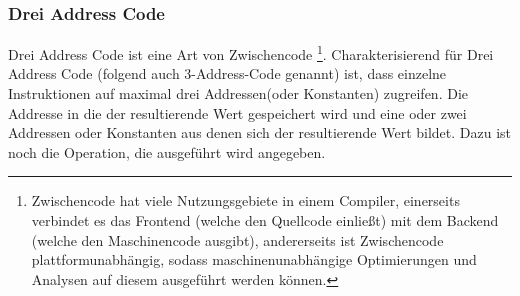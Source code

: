 \subsubsection{Drei Address Code} \label{t:tac}
Drei Address Code ist eine Art von Zwischencode
\footnote{Zwischencode hat viele Nutzungsgebiete in einem Compiler,
einerseits verbindet es das Frontend (welche den Quellcode einließt) mit dem
Backend (welche den Maschinencode ausgibt), andererseits ist Zwischencode 
plattformunabhängig, sodass maschinenunabhängige Optimierungen und Analysen auf
diesem ausgeführt werden können.}. 
Charakterisierend für Drei Address Code (folgend auch 3-Address-Code genannt)
ist, dass einzelne Instruktionen auf maximal drei Addressen(oder Konstanten) 
zugreifen. Die Addresse in die der resultierende Wert gespeichert wird und 
eine oder zwei Addressen oder Konstanten aus denen sich der resultierende Wert bildet.
Dazu ist noch die Operation, die ausgeführt wird angegeben.\\

